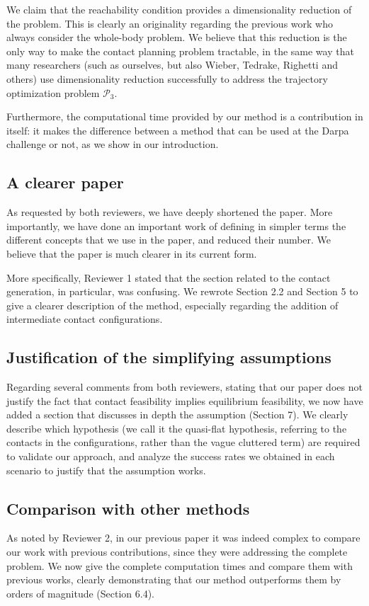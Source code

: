 \documentclass[a4paper]{article}
\begin{document}
We claim that the reachability condition provides a dimensionality reduction of the problem. This is clearly an originality regarding the previous work who always consider the whole-body problem.
We believe that this reduction is the only way to make the contact planning problem tractable, in the same way that many researchers (such as ourselves, but also Wieber, Tedrake, Righetti and others) use dimensionality reduction successfully to address the trajectory optimization problem $\mathcal{P}_3$.

Furthermore, the computational time provided by our method is a contribution in itself: it makes the difference
between a method that can be used at the Darpa challenge or not, as we show in our introduction.


\subsection{A clearer paper}
As requested by both reviewers, we have deeply shortened the paper. More importantly, we have done an important work of defining in simpler terms
the different concepts that we use in the paper, and reduced their number.
We believe that the paper is much clearer in its current form.

More specifically, Reviewer 1 stated that the section related to the contact generation, in particular, was confusing. We rewrote Section 2.2 and Section 5 to give a clearer
description of the method, especially regarding the addition of intermediate contact configurations. 

\subsection{Justification of the simplifying assumptions}
Regarding several comments from both reviewers, stating that our paper does not justify the fact that contact feasibility implies equilibrium feasibility,
we now have added a section that discusses in depth the assumption (Section 7). We clearly describe which hypothesis (we call it the quasi-flat hypothesis, referring
to the contacts in the configurations, rather than the vague cluttered term) are required to validate our approach, and analyze
the success rates we obtained in each scenario to justify that the assumption works.

\subsection{Comparison with other methods}
As noted by Reviewer 2, in our previous paper it was indeed complex to compare our work with previous contributions,
since they were addressing the complete problem. We now give the complete computation times and compare them with previous works,
clearly demonstrating that our method outperforms them by orders of magnitude (Section 6.4).
\end{document}
